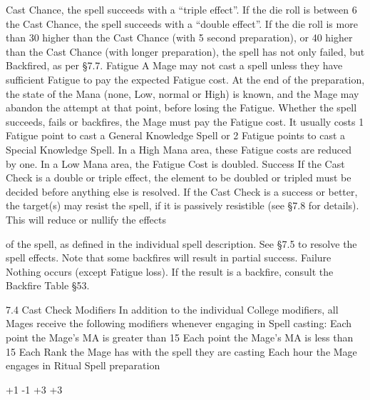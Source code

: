 \documentclass[a4paper]{article}
\begin{document}
\begin{multicols}{3}
Cast Chance, the spell succeeds with a “triple
effect”. If the die roll is between 6%
the Cast Chance, the spell succeeds with a “double
effect”. If the die roll is more than 30 higher than
the Cast Chance (with 5 second preparation), or 40
higher than the Cast Chance (with longer preparation), the spell has not only failed, but Backfired,
as per §7.7.
Fatigue A Mage may not cast a spell unless they
have sufficient Fatigue to pay the expected Fatigue
cost. At the end of the preparation, the state of the
Mana (none, Low, normal or High) is known, and
the Mage may abandon the attempt at that point,
before losing the Fatigue. Whether the spell succeeds, fails or backfires, the Mage must pay the
Fatigue cost. It usually costs 1 Fatigue point to cast
a General Knowledge Spell or 2 Fatigue points to
cast a Special Knowledge Spell. In a High Mana
area, these Fatigue costs are reduced by one. In a
Low Mana area, the Fatigue Cost is doubled.
Success If the Cast Check is a double or triple
effect, the element to be doubled or tripled must be
decided before anything else is resolved. If the
Cast Check is a success or better, the target(s) may
resist the spell, if it is passively resistible (see §7.8
for details). This will reduce or nullify the effects

of the spell, as defined in the individual spell description. See §7.5 to resolve the spell effects. Note
that some backfires will result in partial success.
Failure Nothing occurs (except Fatigue loss). If
the result is a backfire, consult the Backfire Table
§53.

7.4 Cast Check Modifiers
In addition to the individual College modifiers, all
Mages receive the following modifiers whenever
engaging in Spell casting:
Each point the Mage’s MA is greater than 15
Each point the Mage’s MA is less than 15
Each Rank the Mage has with the spell they
are casting
Each hour the Mage engages in Ritual Spell
preparation

+1
-1
+3
+3


\end{multicols}
\end{document}
